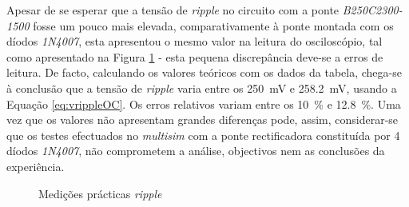 Apesar de se esperar que a tensão de \textit{ripple} no circuito com a ponte \textit{B250C2300-1500} fosse um pouco mais elevada, comparativamente à ponte montada com os díodos \textit{1N4007}, esta apresentou o mesmo valor na leitura do osciloscópio, tal como apresentado na Figura \ref{fig:testesrippleOC} - esta pequena discrepância deve-se a erros de leitura. De facto, calculando os valores teóricos com os dados da tabela, chega-se à conclusão que a tensão de \textit{ripple} varia entre os \SI{250}{\milli\volt} e \SI{258.2}{\milli\volt}, usando a Equação \ref{eq:vrippleOC}. Os erros relativos variam entre os \SI{10}{\percent} e \SI{12.8}{\percent}. Uma vez que os valores não apresentam grandes diferenças pode, assim, considerar-se que os testes efectuados no \textit{multisim} com a ponte rectificadora constituída por 4 díodos \textit{1N4007}, não comprometem a análise, objectivos nem as conclusões da experiência.

\begin{figure}[hbtp]
	\centering%
		\centering
		\qquad
		\caption{Medições prácticas  \textit{ripple}}%
		\label{fig:testesrippleOC}%
	\end{figure}

